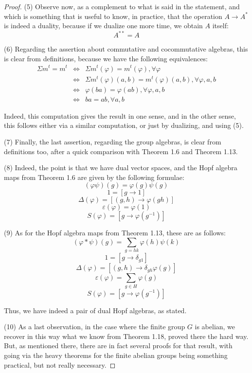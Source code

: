 \documentclass[12pt]{amsbook}
\begin{document}
\begin{proof}
\medskip

(5) Observe now, as a complement to what is said in the statement, and which is something that is useful to know, in practice, that the operation $A\to A^*$ is indeed a duality, because if we dualize one more time, we obtain $A$ itself:
$$A^{**}=A$$

(6) Regarding the assertion about commutative and cocommutative algebras, this is clear from definitions, because we have the following equivalences:
\begin{eqnarray*}
\Sigma m^t=m^t
&\iff&\Sigma m^t(\varphi)=m^t(\varphi),\forall\varphi\\
&\iff&\Sigma m^t(\varphi)(a,b)=m^t(\varphi)(a,b),\forall\varphi,a,b\\
&\iff&\varphi(ba)=\varphi(ab),\forall\varphi,a,b\\
&\iff&ba=ab,\forall a,b
\end{eqnarray*}

Indeed, this computation gives the result in one sense, and in the other sense, this follows either via a similar computation, or just by dualizing, and using (5).

\medskip

(7) Finally, the last assertion, regarding the group algebras, is clear from definitions too, after a quick comparison with Theorem 1.6 and Theorem 1.13. 

\medskip

(8) Indeed, the point is that we have dual vector spaces, and the Hopf algebra maps from Theorem 1.6 are given by the following formulae:
$$(\varphi\psi)(g)=\varphi(g)\psi(g)$$
$$1=[g\to1]$$
$$\Delta(\varphi)=[(g,h)\to \varphi(gh)]$$
$$\varepsilon(\varphi)=\varphi(1)$$
$$S(\varphi)=[g\to\varphi(g^{-1})]$$

(9) As for the Hopf algebra maps from Theorem 1.13, these are as follows:
$$(\varphi*\psi)(g)=\sum_{g=hk}\varphi(h)\psi(k)$$
$$1=[g\to\delta_{g1}]$$
$$\Delta(\varphi)=[(g,h)\to\delta_{gh}\varphi(g)]$$
$$\varepsilon(\varphi)=\sum_{g\in H}\varphi(g)$$ 
$$S(\varphi)=[g\to\varphi(g^{-1})]$$

Thus, we have indeed a pair of dual Hopf algebras, as stated.

\medskip

(10) As a last observation, in the case where the finite group $G$ is abelian, we recover in this way what we know from Theorem 1.18, proved there the hard way. But, as mentioned there, there are in fact several proofs for that result, with going via the heavy theorems for the finite abelian groups being something practical, but not really necessary.
\end{proof}
\end{document}
